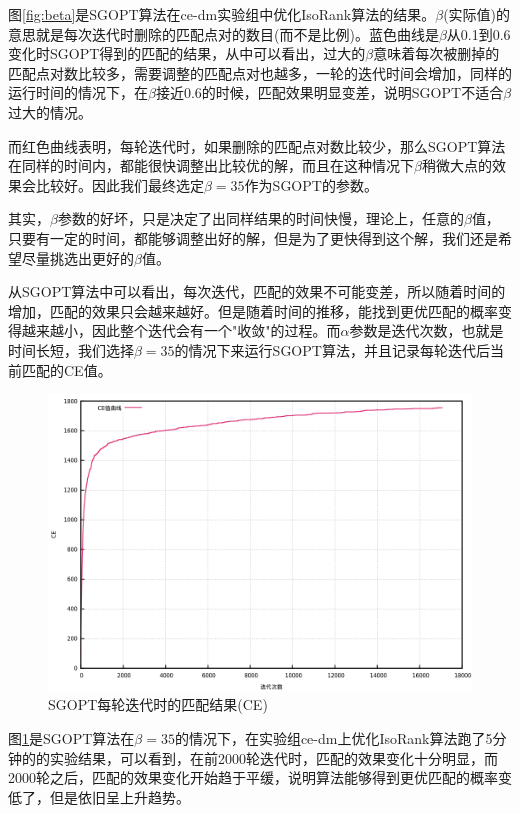 图\ref{fig:beta}是SGOPT算法在ce-dm实验组中优化IsoRank算法的结果。$\beta$(实际值)的意思就是每次迭代时删除的匹配点对的数目(而不是比例)。蓝色曲线是$\beta$从0.1到0.6变化时SGOPT得到的匹配的结果，从中可以看出，过大的$\beta$意味着每次被删掉的匹配点对数比较多，需要调整的匹配点对也越多，一轮的迭代时间会增加，同样的运行时间的情况下，在$\beta$接近0.6的时候，匹配效果明显变差，说明SGOPT不适合$\beta$过大的情况。

而红色曲线表明，每轮迭代时，如果删除的匹配点对数比较少，那么SGOPT算法在同样的时间内，都能很快调整出比较优的解，而且在这种情况下$\beta$稍微大点的效果会比较好。因此我们最终选定$\beta=35$作为SGOPT的参数。

其实，$\beta$参数的好坏，只是决定了出同样结果的时间快慢，理论上，任意的$\beta$值，只要有一定的时间，都能够调整出好的解，但是为了更快得到这个解，我们还是希望尽量挑选出更好的$\beta$值。

从SGOPT算法中可以看出，每次迭代，匹配的效果不可能变差，所以随着时间的增加，匹配的效果只会越来越好。但是随着时间的推移，能找到更优匹配的概率变得越来越小，因此整个迭代会有一个"收敛"的过程。而$\alpha$参数是迭代次数，也就是时间长短，我们选择$\beta=35$的情况下来运行SGOPT算法，并且记录每轮迭代后当前匹配的CE值。

\begin{figure}[htbp]
\centering
\includegraphics[height=0.4\textheight]{pic/alpha.png}
\caption{SGOPT每轮迭代时的匹配结果(CE)} 
\label{fig:alpha}
\end{figure}

图\ref{fig:alpha}是SGOPT算法在$\beta=35$的情况下，在实验组ce-dm上优化IsoRank算法跑了5分钟的的实验结果，可以看到，在前2000轮迭代时，匹配的效果变化十分明显，而2000轮之后，匹配的效果变化开始趋于平缓，说明算法能够得到更优匹配的概率变低了，但是依旧呈上升趋势。

